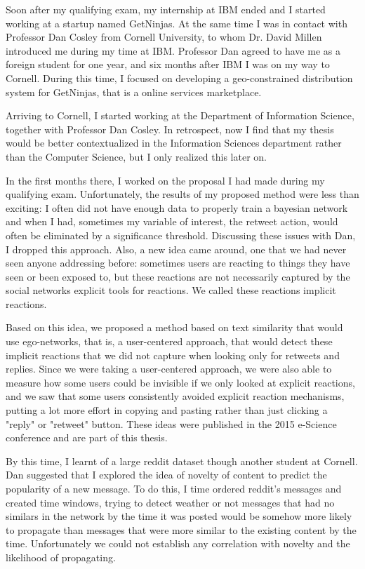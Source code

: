 Soon after my qualifying exam, my internship at IBM ended and I started working at a startup named GetNinjas. At the same time I was in contact with Professor Dan Cosley from Cornell University, to whom Dr. David Millen introduced me during my time at IBM. Professor Dan agreed to have me as a foreign student for one year, and six months after IBM I was on my way to Cornell. During this time, I focused on developing a geo-constrained distribution system for GetNinjas, that is a online services marketplace.

Arriving to Cornell, I started working at the Department of Information Science, together with Professor Dan Cosley. In retrospect, now I find that my thesis would be better contextualized in the Information Sciences department rather than the Computer Science, but I only realized this later on. 

In the first months there, I worked on the proposal I had made during my qualifying exam. Unfortunately, the results of my proposed method were less than exciting: I often did not have enough data to properly train a bayesian network and when I had, sometimes my variable of interest, the retweet action, would often be eliminated by a significance threshold. Discussing these issues with Dan, I dropped this approach. Also, a new idea came around, one that we had never seen anyone addressing before: sometimes users are reacting to things they have seen or been exposed to, but these reactions are not necessarily captured by the social networks explicit tools for reactions. We called these reactions implicit reactions.

Based on this idea, we proposed a method based on text similarity that would use ego-networks, that is, a user-centered approach, that would detect these implicit reactions that we did not capture when looking only for retweets and replies. Since we were taking a user-centered approach, we were also able to measure how some users could be invisible if we only looked at explicit reactions, and we saw that some users consistently avoided explicit reaction mechanisms, putting a lot more effort in copying and pasting rather than just clicking a "reply" or "retweet" button. These ideas were published in the 2015 e-Science conference and are part of this thesis.

By this time, I learnt of a large reddit dataset though another student at Cornell. Dan suggested that I explored the idea of novelty of content to predict the popularity of a new message. To do this, I time ordered reddit's messages and created time windows, trying to detect weather or not messages that had no similars in the network by the time it was posted would be somehow more likely to propagate than messages that were more similar to the existing content by the time. Unfortunately we could not establish any correlation with novelty and the likelihood of propagating.

